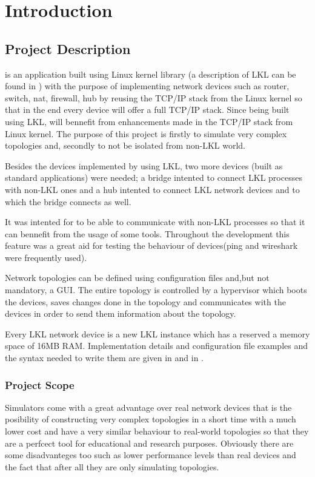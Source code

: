 \chapter{Introduction}
\label{chapter:intro}

\section{Project Description}
\label{sec:proj}

\project is an application built using Linux kernel library (a description of LKL can be found in ) with the purpose of implementing network devices such as router, switch, nat, firewall, hub by reusing the TCP/IP stack from the Linux kernel so that in the end every device will offer a full TCP/IP stack. Since being built using LKL, \project will bennefit from enhancements made in the TCP/IP stack from Linux kernel. The purpose of this project is firstly to simulate very complex topologies and, secondly to not be isolated from non-LKL world.

Besides the devices implemented by using LKL, two more devices (built as standard applications) were needed; a bridge intented to connect LKL processes with non-LKL ones and a hub  intented to connect LKL network devices and to which the bridge connects as well.

It was intented for \project to be able to communicate with non-LKL processes so that it can bennefit from the usage of some tools. Throughout the \project development this feature was a great aid for testing the behaviour of devices(ping and wireshark were frequently used).   

Network topologies can be defined using configuration files and,but not mandatory, a GUI. The entire topology is controlled by a hypervisor which boots the devices, saves changes done in the topology and communicates with the devices in order to send them information about the topology.

Every LKL network device is a new LKL instance which has a reserved a memory space of 16MB RAM.
Implementation details and configuration file examples and the syntax needed to write them are given in  and in .
\subsection{Project Scope}
\label{sub-sec:proj-scope}
Simulators come with a great advantage over real network devices that is the posibility of constructing very complex topologies in a short time with a much lower cost and have a very similar behaviour to real-world topologies so that they are a perfcect tool for educational and research purposes. Obviously there are some disadvanteges too such as lower performance levels than real devices and the fact that after all they are only simulating topologies.

